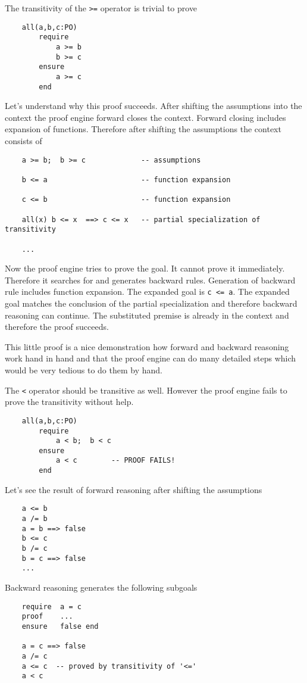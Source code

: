 The transitivity of the \lstinline!>=! operator is trivial to prove
\begin{lstlisting}
    all(a,b,c:PO)
        require
            a >= b
            b >= c
        ensure
            a >= c
        end
\end{lstlisting}

Let's understand why this proof succeeds. After shifting the assumptions into
the context the proof engine forward closes the context. Forward closing
includes expansion of functions. Therefore after shifting the assumptions the
context consists of
\begin{lstlisting}
    a >= b;  b >= c             -- assumptions

    b <= a                      -- function expansion

    c <= b                      -- function expansion

    all(x) b <= x  ==> c <= x   -- partial specialization of transitivity

    ...
\end{lstlisting}

Now the proof engine tries to prove the goal. It cannot prove it
immediately. Therefore it searches for and generates backward
rules. Generation of backward rule includes function expansion. The expanded
goal is \lstinline!c <= a!. The expanded goal matches the conclusion of the
partial specialization and therefore backward reasoning can continue. The
substituted premise is already in the context and therefore the proof
succeeds.

This little proof is a nice demonstration how forward and backward reasoning
work hand in hand and that the proof engine can do many detailed steps which
would be very tedious to do them by hand.


The \lstinline!<! operator should be transitive as well. However the proof
engine fails to prove the transitivity without help.
%
\begin{lstlisting}
    all(a,b,c:PO)
        require
            a < b;  b < c
        ensure
            a < c        -- PROOF FAILS!
        end
\end{lstlisting}

Let's see the result of forward reasoning after shifting the assumptions
\begin{lstlisting}
    a <= b
    a /= b
    a = b ==> false
    b <= c
    b /= c
    b = c ==> false
    ...
\end{lstlisting}
Backward reasoning generates the following subgoals
\begin{lstlisting}
    require  a = c
    proof    ...
    ensure   false end

    a = c ==> false
    a /= c
    a <= c  -- proved by transitivity of '<='
    a < c
\end{lstlisting}

